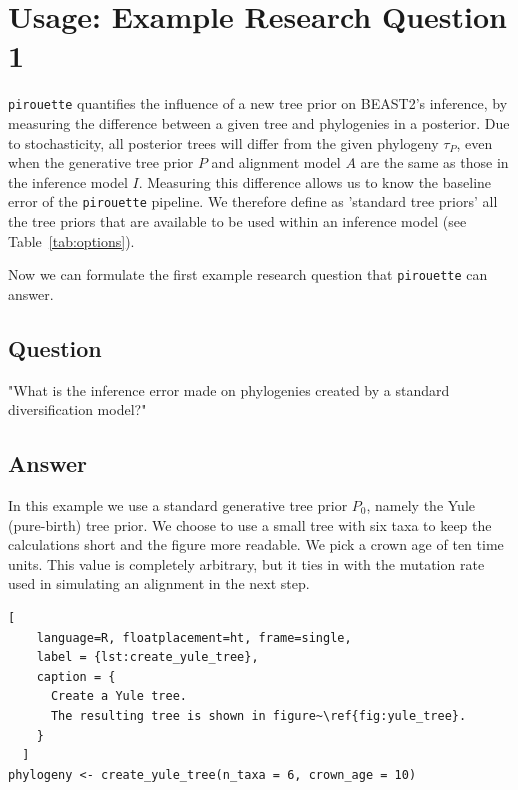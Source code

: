 \documentclass{article}
\begin{document}
\section{Usage: Example Research Question 1}

\verb;pirouette; quantifies the influence of a new tree prior on BEAST2's 
inference,
by measuring the difference between a given tree and 
phylogenies in a posterior. Due to stochasticity, all posterior trees
will differ from the given phylogeny $\tau_{\mathit{P}}$, 
even when the generative tree prior $\mathit{P}$ 
and alignment model $\mathit{A}$ are the same as 
those in the inference model $\mathit{I}$.
Measuring this difference allows us to know the baseline error
of the \verb;pirouette; pipeline. We therefore define as 'standard tree priors' 
all the tree priors that are available to be used within an inference model 
(see Table~\ref{tab:options}).

Now we can formulate the first example research question that \verb;pirouette; 
can answer.

\subsection{Question}

"What is the inference error made on phylogenies
created by a standard diversification model?"

\subsection{Answer}

In this example we use a standard generative tree prior $\mathit{P_{0}}$, 
namely the Yule (pure-birth) tree prior. 
We choose to use a small tree with six taxa to keep
the calculations short and the figure more readable.
We pick a crown age of ten time units. This value is 
completely arbitrary, but it ties in with the mutation rate 
used in simulating an alignment in the next step.

\begin{lstlisting}[
    language=R, floatplacement=ht, frame=single, 
    label = {lst:create_yule_tree}, 
    caption = {
      Create a Yule tree. 
      The resulting tree is shown in figure~\ref{fig:yule_tree}.
    }
  ]
phylogeny <- create_yule_tree(n_taxa = 6, crown_age = 10)
\end{lstlisting}
\end{document}
